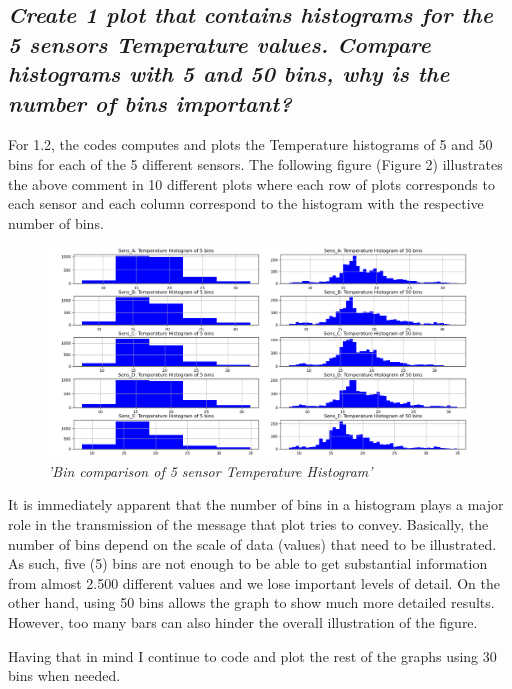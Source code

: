 \documentclass[a4paper,12pt]{article} %
\begin{document}
\subsection{\it Create 1 plot that contains histograms for the 5 sensors Temperature values. Compare histograms with 5 and 50 bins, why is the number of bins important?}




For 1.2, the codes computes and plots the Temperature
histograms of 5 and 50 bins for each of the 5 different sensors. 
The following figure (Figure 2) illustrates the above comment in 10 different 
plots where each row of plots corresponds to each sensor and each column 
correspond to the histogram with the respective number of bins.



\begin{figure}[H]
\centering
\includegraphics[width=\textwidth]{Graphs/Bin_comparison_of_5_sensor_Temperature_Histogram.png}
\caption{\it'Bin comparison of 5 sensor Temperature Histogram'}
\end{figure}




It is immediately apparent that the number of bins in a histogram plays a 
major role in the transmission of the message that plot tries to convey. 
Basically, the number of bins depend on the scale of data (values) 
that need to be illustrated. As such, five (5) bins are not enough 
to be able to get substantial information from almost 2.500 different 
values and we lose important levels of detail. On the other hand, using 
50 bins allows the graph to show much more detailed results. However, too 
many bars can also hinder the overall illustration of the figure.




Having that in mind I continue to code and plot the rest of the graphs using 30 bins when needed.  
\end{document}
